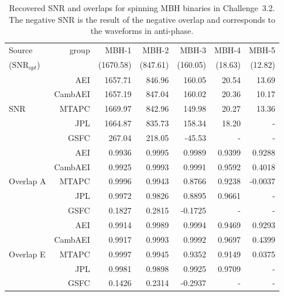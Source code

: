 \documentclass{iopart}
\begin{document}
\begin{table}
\begin{center}
\begin{tabular}{lr|rrrrr}
\hline
Source                              & group &  MBH-1      & MBH-2   & MBH-3    & MBH-4 & MBH-5   \\
($\textrm{SNR}_{opt}$) &              & (1670.58) & (847.61) & (160.05) & (18.63) & (12.82) \\
\hline
                      & AEI            & 1657.71 & 846.96 & 160.05 & 20.54 & 13.69 \\
                      & CambAEI & 1657.19 & 847.04 & 160.02 & 20.36 & 10.17 \\
SNR             & MTAPC    & 1669.97 & 842.96 & 149.98 & 20.27 & 13.36\\
                      & JPL           & 1664.87 & 835.73 & 158.34 & 18.20 & - \\
                      & GSFC       &   267.04 & 218.05 &  -45.53 & - & - \\
\hline
                      & AEI            & 0.9936 & 0.9995 &  0.9989 & 0.9399 &  0.9288 \\
                      & CambAEI & 0.9925 & 0.9993 &  0.9991 & 0.9592 &  0.4018 \\
Overlap A    & MTAPC    & 0.9996 & 0.9943 &  0.8766 & 0.9238 & -0.0037 \\
                      & JPL           & 0.9972 & 0.9826 &  0.8895 & 0.9661 & - \\
                      & GSFC       & 0.1827 & 0.2815 & -0.1725 & - & - \\
\hline
                      & AEI            & 0.9914 & 0.9989 &  0.9994 & 0.9469 &  0.9293 \\
                      & CambAEI & 0.9917 & 0.9993 &  0.9992 & 0.9697 &  0.4399 \\
Overlap E    & MTAPC    & 0.9997 & 0.9945 &  0.9352 & 0.9149 &  0.0375\\
                      & JPL           & 0.9981 & 0.9898 &  0.9925 & 0.9709 & - \\
                      & GSFC       & 0.1426 & 0.2314 & -0.2937 & - & - \\
\hline
\end{tabular}
\end{center}
\caption{ Recovered SNR and overlaps for spinning MBH binaries in Challenge~3.2. The negative
SNR is the result of the negative overlap and corresponds to  the waveforms in anti-phase.
\label{tab:SMBH_SNR}}
\end{table} 
\end{document}
